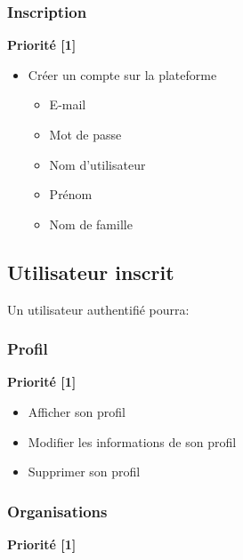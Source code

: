 \documentclass[11pt, a4paper, french, twoside]{article}
\begin{document}
			\subsubsection{Inscription}
			\label{subsubsec:inscription}
			
				\textbf{Priorité [1]}
			
				\begin{itemize}
					\item Créer un compte sur la plateforme
						\begin{itemize}
							\item E-mail
							\item Mot de passe
							\item Nom d'utilisateur
							\item Prénom
							\item Nom de famille
						\end{itemize}
				\end{itemize}
		
		\subsection{Utilisateur inscrit}
		\label{subsec:utilisateur_inscrit}
			Un utilisateur authentifié pourra:
			
			\subsubsection{Profil}
			\label{subsubsec:profil}
				
				\textbf{Priorité [1]}
			
				\begin{itemize}
					\item Afficher son profil
					\item Modifier les informations de son profil
					\item Supprimer son profil
				\end{itemize}
			
			\subsubsection{Organisations}
			\label{subsubsec:organisations}
				
				\textbf{Priorité [1]}
			
\end{document}
